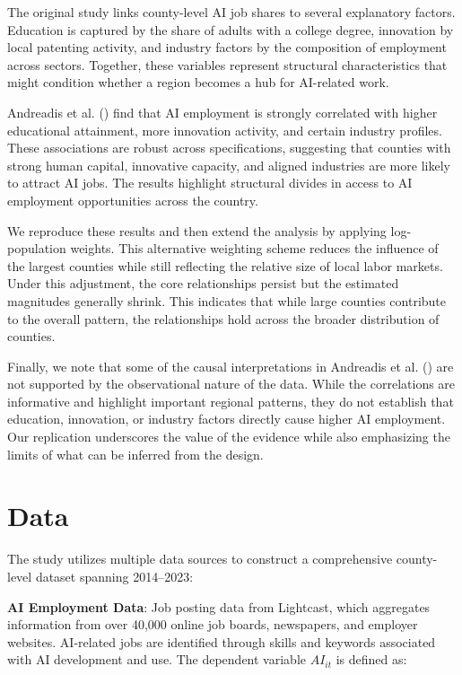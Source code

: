 \documentclass[
]{article}
\begin{document}
The original study links county-level AI job shares to several
explanatory factors. Education is captured by the share of adults with a
college degree, innovation by local patenting activity, and industry
factors by the composition of employment across sectors. Together, these
variables represent structural characteristics that might condition
whether a region becomes a hub for AI-related work.

Andreadis et al. () find that AI
employment is strongly correlated with higher educational attainment,
more innovation activity, and certain industry profiles. These
associations are robust across specifications, suggesting that counties
with strong human capital, innovative capacity, and aligned industries
are more likely to attract AI jobs. The results highlight structural
divides in access to AI employment opportunities across the country.

We reproduce these results and then extend the analysis by applying
log-population weights. This alternative weighting scheme reduces the
influence of the largest counties while still reflecting the relative
size of local labor markets. Under this adjustment, the core
relationships persist but the estimated magnitudes generally shrink.
This indicates that while large counties contribute to the overall
pattern, the relationships hold across the broader distribution of
counties.

Finally, we note that some of the causal interpretations in Andreadis et
al. () are not supported by the
observational nature of the data. While the correlations are informative
and highlight important regional patterns, they do not establish that
education, innovation, or industry factors directly cause higher AI
employment. Our replication underscores the value of the evidence while
also emphasizing the limits of what can be inferred from the design.

\section{Data}\label{data}

The study utilizes multiple data sources to construct a comprehensive
county-level dataset spanning 2014--2023:

\textbf{AI Employment Data}: Job posting data from Lightcast, which
aggregates information from over 40,000 online job boards, newspapers,
and employer websites. AI-related jobs are identified through skills and
keywords associated with AI development and use. The dependent variable
\(AI_{it}\) is defined as:
\end{document}
